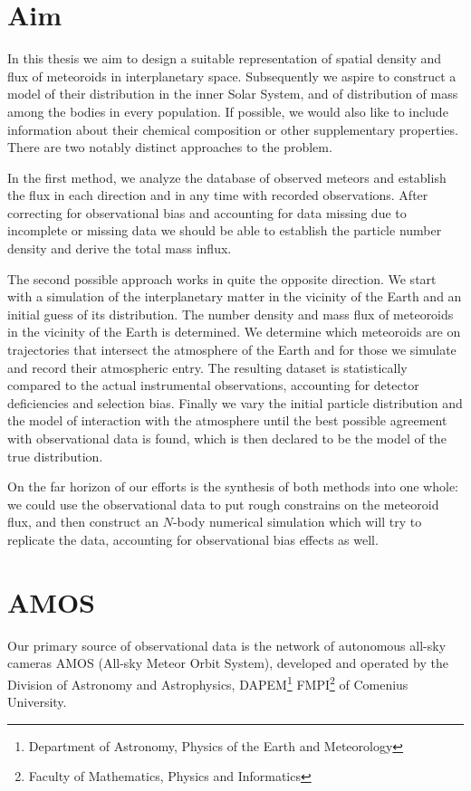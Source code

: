 \section{Aim} \label{ia}
    In this thesis we aim to design a suitable representation of spatial density
    and flux of meteoroids in interplanetary space. Subsequently we aspire to
    construct a model of their distribution in the inner Solar System,
    and of distribution of mass among the bodies in every population.
    If possible, we would also like to include information
    about their chemical composition or other supplementary properties.
    There are two notably distinct approaches to the problem.

    In the first method, we analyze the database of observed meteors and establish
    the flux in each direction and in any time with recorded observations.
    After correcting for observational bias and accounting for data missing due
    to incomplete or missing data we should be able to establish the particle
    number density and derive the total mass influx.

    The second possible approach works in quite the opposite direction. We start with a simulation
    of the interplanetary matter in the vicinity of the Earth and an initial guess of its distribution.
    The number density and mass flux of meteoroids in the vicinity of the Earth is determined.
    We determine which meteoroids are on trajectories that intersect the atmosphere of the Earth
    and for those we simulate and record their atmospheric entry. The resulting dataset is statistically compared
    to the actual instrumental observations, accounting for detector deficiencies and selection bias.
    Finally we vary the initial particle distribution and the model of interaction with the atmosphere
    until the best possible agreement with observational data is found, which is then
    declared to be the model of the true distribution.

    On the far horizon of our efforts is the synthesis of both methods into one whole:
    we could use the observational data to put rough constrains on the meteoroid flux,
    and then construct an $N$-body numerical simulation which will try to replicate the data,
    accounting for observational bias effects as well.

\section{AMOS} \label{iA}
    Our primary source of observational data is the network of autonomous all-sky cameras AMOS (All-sky Meteor Orbit System),
    developed and operated by the Division of Astronomy and Astrophysics,
    DAPEM\footnote{Department of Astronomy, Physics of the Earth and Meteorology}
    FMPI\footnote{Faculty of Mathematics, Physics and Informatics} of Comenius University.

